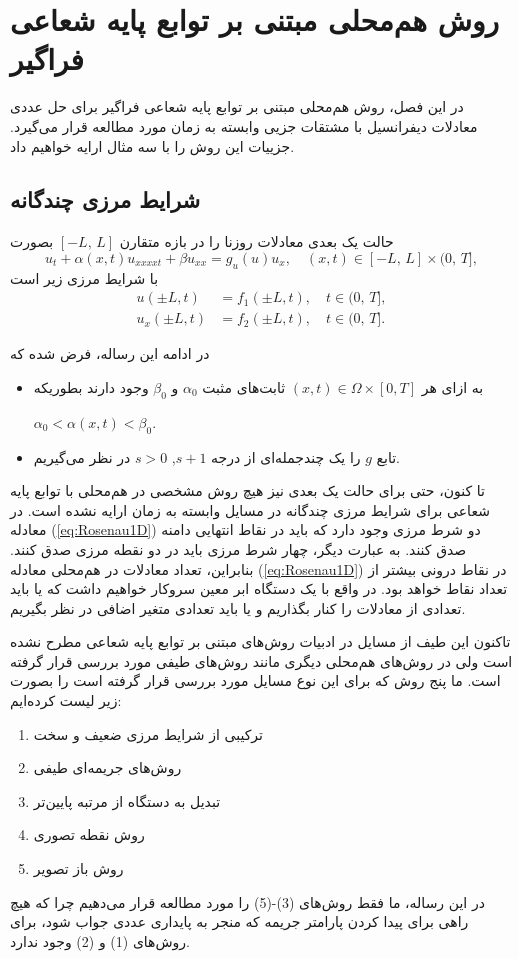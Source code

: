 
\chapter{روش هم‌محلی مبتنی بر توابع پایه شعاعی فراگیر  }\label{se:grbf}
%

در این فصل، روش هم‌محلی مبتنی بر توابع پایه شعاعی فراگیر برای حل عددی معادلات دیفرانسیل با مشتقات جزیی وابسته به زمان مورد مطالعه قرار می‌گیرد. جزییات این روش را با سه مثال ارایه خواهیم داد.



\section{شرایط مرزی چندگانه}
حالت یک بعدی معادلات روزنا را در بازه متقارن 
$[-L,\,L]$ 
بصورت
\begin{equation}
	u_t+\alpha(x,t)u_{xxxxt}+\beta u_{xx}= g_u(u)u_x,\quad(x,t)\in
	[-L,\,L]\times(0,\,T], \label{eq:Rosenau1D}
\end{equation}
با شرایط مرزی زیر است
\begin{align}
	u(\pm L,t)&=f_1(\pm L,t),\quad t\in (0,\,T],\\
	u_x(\pm L,t)&=f_2(\pm L,t),\quad t\in (0,\,T].\label{eq:1Dic}
\end{align}

در ادامه این رساله، فرض شده که
\begin{itemize}
	\item
	به ازای هر
	$(x,t)\in\Omega\times[0,T]$
	ثابت‌های مثبت
	$\alpha_0$
	و
	$\beta_0$
	وجود دارند بطوریکه
	
	$\alpha_0<\alpha(x,t)<\beta_0$.
	
	\item 
	تابع $g$ را یک چندجمله‌ای از درجه 
	$s+1$, $s>0$
	در نظر می‌گیریم.
\end{itemize}
تا کنون، حتی برای حالت یک بعدی نیز هیچ روش مشخصی در هم‌محلی با توابع پایه شعاعی برای شرایط مرزی چندگانه در مسایل وابسته به زمان ارایه نشده است. در معادله
(\ref{eq:Rosenau1D})
دو شرط مرزی وجود دارد که باید در نقاط انتهایی دامنه صدق کنند. به عبارت دیگر، چهار شرط مرزی باید در دو نقطه مرزی صدق کنند. بنابراین، تعداد معادلات در هم‌محلی معادله 
(\ref{eq:Rosenau1D})
در نقاط درونی بیشتر از تعداد نقاط خواهد بود. در واقع با یک دستگاه ابر معین سروکار خواهیم داشت که یا باید تعدادی از معادلات را کنار بگذاریم و یا باید تعدادی متغیر اضافی در نظر بگیریم.

تاکنون این طیف از مسایل در ادبیات روش‌های مبتنی بر توابع پایه شعاعی مطرح نشده است ولی در روش‌های هم‌محلی دیگری مانند روش‌های طیفی مورد بررسی قرار گرفته است. ما پنج روش که برای این نوع مسایل مورد بررسی قرار گرفته است را بصورت زیر لیست کرده‌ایم:
\begin{enumerate}
	\item ترکیبی از شرایط مرزی ضعیف و سخت 
	\item روش‌های جریمه‌ای طیفی 
	\item تبدیل به دستگاه از مرتبه پایین‌تر 
	\item روش نقطه تصوری
	\item روش باز تصویر
\end{enumerate}
در این رساله، ما فقط روش‌های (3)-(5) را مورد مطالعه قرار می‌دهیم چرا که هیچ راهی برای پیدا کردن پارامتر جریمه که منجر به پایداری عددی جواب شود، برای روش‌های (1) و (2) وجود ندارد.

